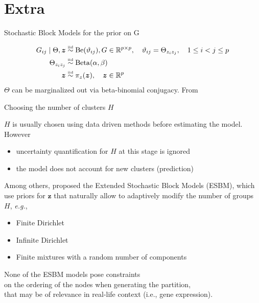 \section*{Extra}
\begin{frame}{Stochastic Block Models for the prior on G}

\begin{align*}
    G_{ij} \mid \Theta,\bm{z} &\overset{\text{\tiny{iid}}}{\sim} \operatorname{Be}(\vartheta_{ij}),  G \in \mathbb{R}^{p \times p}, \quad \vartheta_{ij} = \Theta_{z_{i}z_{j}}, \quad 1 \le i < j \le p \\ 
    \Theta_{z_{i}z_{j}} &\overset{\text{\tiny{iid}}}{\sim} \operatorname{Beta}(\alpha, \beta)\\
    \bm{z} &\overset{\text{\tiny{iid}}}{\sim} \pi_{z}(\bm{z}), \quad \bm{z} \in \mathbb{R}^p
\end{align*}
$\Theta$ can be marginalized out via beta-binomial conjugacy.
{\scriptsize From \cite{colombiLearningBlockStructured2022a}}
\end{frame}














\begin{frame}{Choosing the number of clusters $H$}

$H$ is usually chosen using data driven methods \alert{before} estimating the model. However
\begin{itemize}
    \item uncertainty quantification for $H$ at this stage is ignored
    \item the model does not account for new clusters (\alert{prediction})
\end{itemize}
\pause
Among others, \cite{legramantiExtendedStochasticBlock2022} proposed the \alert{Extended Stochastic Block Models (ESBM)}, which use priors for $\bm{z}$ that naturally allow to adaptively modify the number of groups $H$, \emph{e.g.},
\begin{itemize}
    \item Finite Dirichlet
    \item Infinite Dirichlet
    \item Finite mixtures with a random number of components
\end{itemize}

\pause
\begin{center}
    \alert{None of the ESBM models pose constraints\\
    on the ordering of the nodes when generating the partition,\\
    that may be of relevance in real-life context (i.e., gene expression).}    
\end{center}


\end{frame}